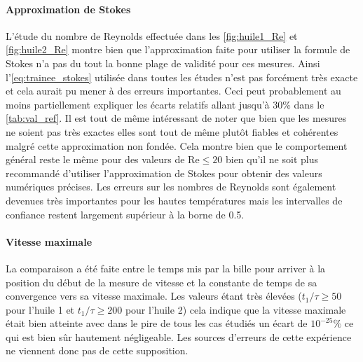 \paragraph{Approximation de Stokes} L'étude du nombre de Reynolds effectuée dans les \autoref{fig:huile1_Re} et \autoref{fig:huile2_Re} montre bien que l'approximation faite pour utiliser la formule de Stokes n'a pas du tout la bonne plage de validité pour ces mesures. Ainsi l'\autoref{eq:trainee_stokes} utilisée dans toutes les études n'est pas forcément très exacte et cela aurait pu mener à des erreurs importantes. Ceci peut probablement au moins partiellement expliquer les écarts relatifs allant jusqu'à 30\% dans le \autoref{tab:val_ref}. Il est tout de même intéressant de noter que bien que les mesures ne soient pas très exactes elles sont tout de même plutôt fiables et cohérentes malgré cette approximation non fondée. Cela montre bien que le comportement général reste le même pour des valeurs de $\mathrm{Re} \leq 20$ bien qu'il ne soit plus recommandé d'utiliser l'approximation de Stokes pour obtenir des valeurs numériques précises. Les erreurs sur les nombres de Reynolds sont également devenues très importantes pour les hautes températures mais les intervalles de confiance restent largement supérieur à la borne de 0.5.


\paragraph{Vitesse maximale} La comparaison a été faite entre le temps mis par la bille pour arriver à la position du début de la mesure de vitesse et la constante de temps de sa convergence vers sa vitesse maximale. Les valeurs étant très élevées ($t_1/\tau \geq 50$ pour l'huile 1 et $t_1/\tau \geq 200$ pour l'huile 2) cela indique que la vitesse maximale était bien atteinte avec dans le pire de tous les cas étudiés un écart de $10^{-25} \%$ ce qui est bien sûr hautement négligeable. Les sources d'erreurs de cette expérience ne viennent donc pas de cette supposition.